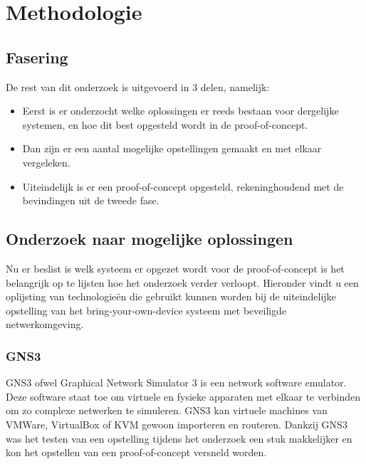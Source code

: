
\chapter{Methodologie}
\label{ch:methodologie}


\section{Fasering}

De rest van dit onderzoek is uitgevoerd in 3 delen, namelijk: 
\begin{itemize}
	\item Eerst is er onderzocht welke oplossingen er reeds bestaan voor dergelijke systemen, en hoe dit best opgesteld wordt in de proof-of-concept.
	\item Dan zijn er een aantal mogelijke opstellingen gemaakt en met elkaar vergeleken.
	\item Uiteindelijk is er een proof-of-concept opgesteld, rekeninghoudend met de bevindingen uit de tweede fase.
\end{itemize}

\section{Onderzoek naar mogelijke oplossingen}
Nu er beslist is welk systeem er opgezet wordt voor de proof-of-concept is het belangrijk op te lijsten hoe het onderzoek verder verloopt. Hieronder vindt u een oplijsting van technologie\"{e}n die gebruikt kunnen worden bij de uiteindelijke opstelling van het bring-your-own-device systeem met beveiligde netwerkomgeving.

\subsection{GNS3}
GNS3 ofwel Graphical Network Simulator 3 is een network software emulator. Deze software staat toe om virtuele en fysieke apparaten met elkaar te verbinden om zo complexe netwerken te simuleren. GNS3 kan virtuele machines van VMWare, VirtualBox of KVM gewoon importeren en routeren. Dankzij GNS3 was het testen van een opstelling tijdens het onderzoek een stuk makkelijker en kon het opstellen van een proof-of-concept versneld worden.

